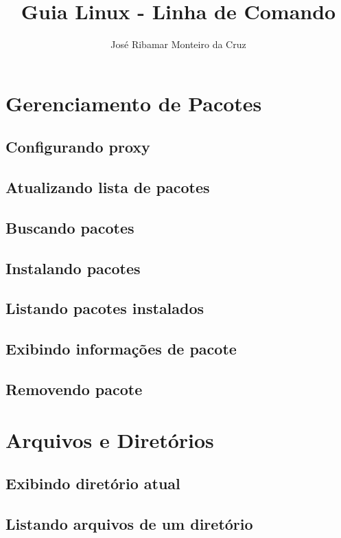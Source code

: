 \documentclass[a4paper,9pt]{extarticle}
\begin{document}
\title{Guia Linux - Linha de Comando}
\author{José Ribamar Monteiro da Cruz}
\maketitle
\tableofcontents



\begin{multicols}{2}
\section{Gerenciamento de Pacotes}
\subsection{Configurando proxy}
\subsection{Atualizando lista de pacotes}
\subsection{Buscando pacotes}
\subsection{Instalando pacotes}
\subsection{Listando pacotes instalados}
\subsection{Exibindo informações de pacote}
\subsection{Removendo pacote}
 
\section{Arquivos e Diretórios}
\subsection{Exibindo diretório atual}

	
\subsection{Listando arquivos de um diretório}
	

\end{multicols}
\end{document}
